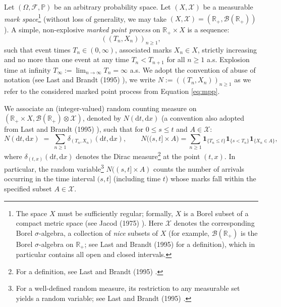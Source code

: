 \documentclass[12pt,a4paper]{report}
\theoremstyle{plain}
\theoremstyle{definition}
\theoremstyle{remark}
\newcommand{\R}{\mathbb{R}}
\newcommand{\1}{\mathbf{1}}
\begin{document}
\medskip
\noindent
Let $(\Omega,\mathcal{F},\mathbb{P})$ be an arbitrary probability space. Let $(X,\mathcal{X})$ be a measurable \emph{mark space}\footnote{The space $X$ must be sufficiently regular; formally, $X$ is a Borel subset of a compact metric space (see Jacod (1975) \cite{Jac75}). Here $\mathcal{X}$ denotes the corresponding Borel $\sigma$-algebra, a collection of \emph{nice} subsets of $X$ (for example, $\mathcal{B}(\mathbb{R}_+)$ is the Borel $\sigma$-algebra on $\mathbb{R}_+$; see Last and Brandt (1995) \cite{LB95} for a definition), which in particular contains all open and closed intervals.}
(without loss of generality, we may take $(X,\mathcal{X}) = (\mathbb{R}_+, \mathcal{B}(\mathbb{R}_+))$).
A simple, non-explosive \emph{marked point process} on $\R_+\times X$
is a sequence:
\begin{equation}\label{eq:mpp}
((T_n,X_n))_{n\ge1},
\end{equation}
such that event times $T_n\in(0,\infty)$, associated marks $X_n\in X$,
strictly increasing and no more than one event at any time $T_n < T_{n+1}$ for all $n\ge1$ a.s.
Explosion time at infinity
$T_\infty := \lim_{n \to \infty} T_n=\infty$ a.s.
We adopt the convention of abuse of notation (see Last and Brandt (1995) \cite{LB95}), we write $N:=((T_n,X_n))_{n\ge1}$ as we refer to the considered marked point process from Equation \eqref{eq:mpp}.

\medskip
\noindent
We associate an (integer-valued) random counting measure
on $(\mathbb{R}_+ \times X, \mathcal{B}(\mathbb{R}_+)\otimes\mathcal{X})$, denoted by $N(\mathrm{d}t,\mathrm{d}x)$ (a convention also adopted from Last and Brandt (1995) \cite{LB95}), such that for $0 \le s \le t$ and $A \in \mathcal{X}$:
\begin{equation}
N(\mathrm{d}t,\mathrm{d}x)\;=\;\sum_{n\ge 1}\delta_{(T_n,X_n)}(\mathrm{d}t,\mathrm{d}x),
\qquad N\bigl((s,t]\times A\bigr)=\sum_{n\ge 1}\mathbf{1}_{\{T_n\le t\}}\mathbf{1}_{\{s< T_n\}}\mathbf{1}_{\{X_n\in A\}},
\label{eq:marked-measure}
\end{equation}
where $\delta_{(t,x)}(\mathrm{d}t,\mathrm{d}x)$ denotes the Dirac measure\footnote{For a definition, see Last and Brandt (1995) \cite{LB95}.} at the point $(t,x)$. In particular, the random variable\footnote{For a well-defined random measure, its restriction to any measurable set yields a random variable; see Last and Brandt (1995) \cite{LB95}.} $N((s,t]\times A)$ counts the number of arrivals occurring in the time interval $(s,t]$ (including time $t$) whose marks fall within the specified subset $A \in \mathcal{X}$.
\end{document}

